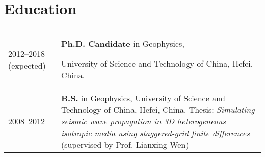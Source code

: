 \section*{Education}
\begin{tabular}{p{} p{}}
2012--2018 (expected) & \textbf{Ph.D. Candidate} in Geophysics,
             \par University of Science and Technology of China, Hefei, China.\\
2008--2012 & \textbf{B.S.} in Geophysics,
             \newline
             University of Science and Technology of China, Hefei, China.
             \newline
             Thesis: \textit{Simulating seismic wave propagation in 3D heterogeneous
             isotropic media using staggered-grid finite differences}
             (supervised by Prof. Lianxing Wen)
\end{tabular}
